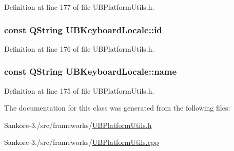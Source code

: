 Definition at line 177 of file U\-B\-Platform\-Utils.\-h.

\hypertarget{class_u_b_keyboard_locale_a53ed8afa7b75cf945a31239d93493610}{
\subsubsection[{id}]{\setlength{\rightskip}{0pt plus 5cm}const Q\-String U\-B\-Keyboard\-Locale\-::id}}\label{d3/d63/class_u_b_keyboard_locale_a53ed8afa7b75cf945a31239d93493610}


Definition at line 176 of file U\-B\-Platform\-Utils.\-h.

\hypertarget{class_u_b_keyboard_locale_a2b0a9e2afe0dff9abdc767ab8d29f59a}{
\subsubsection[{name}]{\setlength{\rightskip}{0pt plus 5cm}const Q\-String U\-B\-Keyboard\-Locale\-::name}}\label{d3/d63/class_u_b_keyboard_locale_a2b0a9e2afe0dff9abdc767ab8d29f59a}


Definition at line 175 of file U\-B\-Platform\-Utils.\-h.



The documentation for this class was generated from the following files\-:\begin{DoxyCompactItemize}
\item 
Sankore-\/3./src/frameworks/\hyperlink{_u_b_platform_utils_8h}{U\-B\-Platform\-Utils.\-h}\item 
Sankore-\/3./src/frameworks/\hyperlink{_u_b_platform_utils_8cpp}{U\-B\-Platform\-Utils.\-cpp}\end{DoxyCompactItemize}
